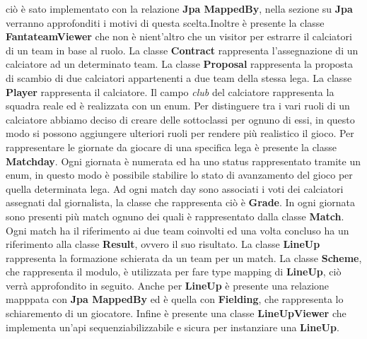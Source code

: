 ciò è sato implementato con la relazione \textbf{Jpa MappedBy}, nella sezione su \textbf{Jpa}
verranno approfonditi i motivi di questa scelta.Inoltre è presente la classe \textbf{FantateamViewer}
che non è nient'altro che un visitor per estrarre il calciatori di un team in base al ruolo. La classe \textbf{Contract} rappresenta l'assegnazione di un
calciatore ad un determinato team. La classe \textbf{Proposal} rappresenta la proposta di scambio
di due calciatori appartenenti a due team della stessa lega. La classe \textbf{Player} rappresenta il calciatore. Il
campo \textit{club} del calciatore rappresenta la squadra reale ed è realizzata con un enum.
Per distinguere tra i vari ruoli di un calciatore abbiamo deciso di creare delle sottoclassi per ognuno di essi,
in questo modo si possono aggiungere ulteriori ruoli per rendere più realistico il gioco.
Per rappresentare le giornate da giocare di una specifica lega è presente la classe \textbf{Matchday}. Ogni giornata è numerata
ed ha uno status rappresentato tramite un enum, in questo modo è possibile stabilire lo stato di avanzamento del gioco
per quella determinata lega. Ad ogni match day sono associati i voti dei calciatori
assegnati dal giornalista, la classe che rappresenta ciò è \textbf{Grade}.
In ogni giornata sono presenti più match ognuno dei quali è rappresentato 
dalla classe \textbf{Match}. Ogni match ha il riferimento ai due team coinvolti
ed una volta concluso ha un riferimento alla classe \textbf{Result}, ovvero il suo risultato.
La classe \textbf{LineUp} rappresenta la formazione schierata da un team per un match.
La classe \textbf{Scheme}, che rappresenta il modulo, è utilizzata per fare type mapping di \textbf{LineUp}, ciò
verrà approfondito in seguito. Anche per \textbf{LineUp} è presente una relazione mapppata
con \textbf{Jpa MappedBy} ed è quella con \textbf{Fielding}, che rappresenta lo schiaremento di un giocatore.
Infine è presente una classe \textbf{LineUpViewer} che implementa un'api sequenziabilizzabile e sicura
per instanziare una \textbf{LineUp}.



